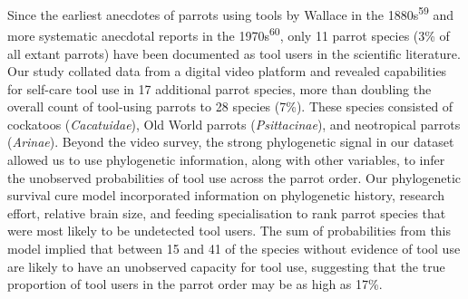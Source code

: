 \documentclass[
  man, donotrepeattitle,floatsintext]{apa6}
\begin{document}
Since the earliest anecdotes of parrots using tools by Wallace in the 1880s\textsuperscript{59} and more systematic anecdotal reports in the 1970s\textsuperscript{60},
only 11 parrot species (3\% of all extant parrots) have been documented as tool
users in the scientific literature. Our study collated data from a digital video
platform and revealed capabilities for self-care tool use in 17 additional
parrot species, more than doubling the overall count of tool-using parrots to
28 species (7\%). These species consisted of cockatoos (\emph{Cacatuidae}), Old World
parrots (\emph{Psittacinae}), and neotropical parrots (\emph{Arinae}). Beyond the video
survey, the strong phylogenetic signal in our dataset allowed us to use
phylogenetic information, along with other variables, to infer the unobserved
probabilities of tool use across the parrot order. Our phylogenetic survival
cure model incorporated information on phylogenetic history, research effort,
relative brain size, and feeding specialisation to rank parrot species that were
most likely to be undetected tool users. The sum of probabilities from this
model implied that between 15 and 41 of the species without evidence of tool use
are likely to have an unobserved capacity for tool use, suggesting that the true
proportion of tool users in the parrot order may be as high as 17\%.
\end{document}
